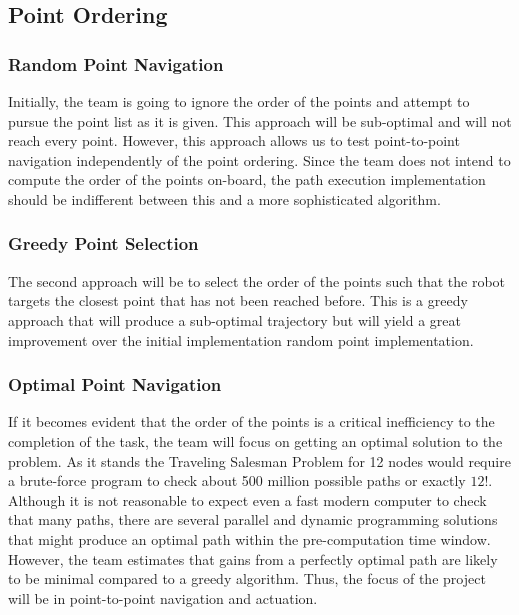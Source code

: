 \documentclass[12pt,conference,onecolumn]{IEEEtran} %
\begin{document}
\subsection{Point Ordering}
\subsubsection{Random Point Navigation}
Initially, the team is going to ignore the order of the points and attempt to pursue the point list as it is given. This approach will be sub-optimal and will not reach every point. However, this approach allows us to test point-to-point navigation independently of the point ordering. Since the team does not intend to compute the order of the points on-board, the path execution implementation should be indifferent between this and a more sophisticated algorithm.
\subsubsection{Greedy Point Selection}
The second approach will be to select the order of the points such that the robot targets the closest point that has not been reached before. This is a greedy approach that will produce a sub-optimal trajectory but will yield a great improvement over the initial implementation random point implementation.
\subsubsection{Optimal Point Navigation}
If it becomes evident that the order of the points is a critical inefficiency to the completion of the task, the team will focus on getting an optimal solution to the problem. As it stands the Traveling Salesman Problem for 12 nodes would require a brute-force program to check about 500 million possible paths or exactly $12!$. Although it is not reasonable to expect even a fast modern computer to check that many paths, there are several parallel and dynamic programming solutions that might produce an optimal path within the pre-computation time window. However, the team estimates that gains from a perfectly optimal path are likely to be minimal compared to a greedy algorithm. Thus, the focus of the project will be in point-to-point navigation and actuation.
\end{document}
